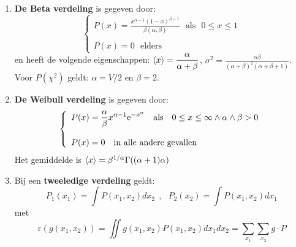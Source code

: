 \begin{enumerate}
\[\begin{array}{l}
      P(x)=\frac{x^{\alpha-1}{\rm e}^{-x/\beta}}{\beta^\alpha\Gamma(\alpha)}~~~\mbox{als}~~~0\leq y\leq\infty
      \end{array}\right.
      \]
      met $\alpha>0$ en $\beta>0$. De verdeling heeft
      de volgende eigenschappen: $\av{x}=\alpha\beta$, $\sigma^2=\alpha\beta^2$.
\item {\bf De Beta verdeling} is gegeven door:
      \[
      \left\{\begin{array}{l}\displaystyle
      P(x)=\frac{x^{\alpha-1}(1-x)^{\beta-1}}{\beta(\alpha,\beta)}~~~\mbox{als}~~~0\leq x\leq1\\
      \\
      P(x)=0~~~\mbox{elders}
      \end{array}\right.
      \]
      en heeft de volgende eigenschappen: $\displaystyle\left\langle x \right\rangle=\frac{\alpha}{\alpha+\beta}$,
      $\displaystyle\sigma^2=\frac{\alpha\beta}{(\alpha+\beta)^2(\alpha+\beta+1)}$.
      \npar
      Voor $P(\chi^2)$ geldt: $\alpha=V/2$ en $\beta=2$.
\item {\bf De Weibull verdeling} is gegeven door:
      \[
      \left\{\begin{array}{l}\displaystyle
      P(x)=\frac{\alpha}{\beta}x^{\alpha-1}{\rm e}^{-x^\alpha}~~~\mbox{als}~~~0\leq x\leq\infty\wedge\alpha\wedge\beta>0\\
      \\
      P(x)=0~~~\mbox{in alle andere gevallen}
      \end{array}\right.
      \]
      Het gemiddelde is $\left\langle x \right\rangle=\beta^{1/\alpha}\Gamma((\alpha+1)\alpha)$
\item Bij een {\bf tweeledige verdeling} geldt:
      \[
      P_1(x_1)=\int P(x_1,x_2)dx_2~~,~~~P_2(x_2)=\int P(x_1,x_2)dx_1
      \]
      met
      \[
      \varepsilon(g(x_1,x_2))=\iint g(x_1,x_2)P(x_1,x_2)dx_1dx_2=\sum_{x_1}\sum_{x_2}g\cdot P
      \]
\end{enumerate}

